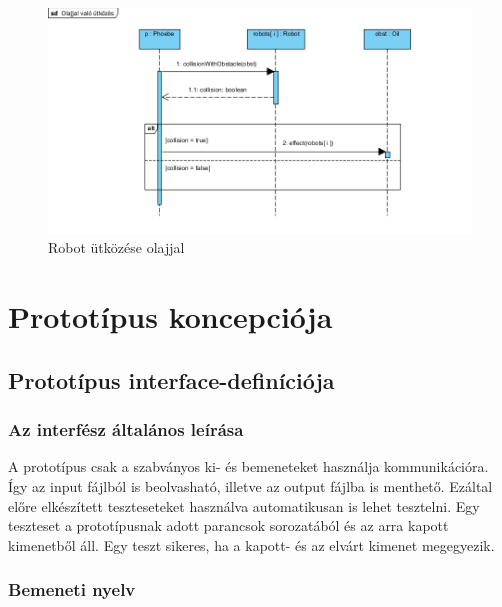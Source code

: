 \begin{figure}[h]
\begin{center}
\includegraphics[width=17cm]{images/Szekvencia_diagrammok/collisionWithOil()_sequence.PNG}
\caption{Robot ütközése olajjal}
\label{fig:example3}
\end{center}
\end{figure}
\pagebreak

\setcounter{chapter}{6}
\chapter{Prototípus koncepciója}

\thispagestyle{fancy}

\section{Prototípus interface-definíciója}


\subsection{Az interfész általános leírása}
A prototípus csak a szabványos ki- és bemeneteket használja kommunikációra. Így az input fájlból is beolvasható, illetve az output fájlba is menthető. Ezáltal előre elkészített teszteseteket használva automatikusan is lehet tesztelni. Egy teszteset a prototípusnak adott parancsok sorozatából és az arra kapott kimenetből áll. Egy teszt sikeres, ha a kapott- és az elvárt kimenet megegyezik.

\subsection{Bemeneti nyelv}

